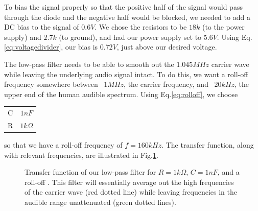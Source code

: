 \documentclass[12pt]{article}
\begin{document}
To bias the signal properly so that the positive half of the signal would pass through the diode and the negative half would be blocked, we needed to add a DC bias to the signal of $0.6V$. We chose the resistors to be $18k$ (to the power supply) and $2.7k$ (to ground), and had our power supply set to $5.6V$. Using Eq.\ref{eq:voltagedivider}, our bias is $0.72V$, just above our desired voltage.

The low-pass filter needs to be able to smooth out the $1.045MHz$ carrier wave while leaving the underlying audio signal intact. To do this, we want a roll-off frequency somewhere between ~$1MHz$, the carrier frequency, and ~$20kHz$, the upper end of the human audible spectrum. Using Eq.\ref{eq:rolloff}, we choose

\begin{center}
  \begin{tabular}{ c  c }
    C & $1nF$ \\
    R & $1k\Omega$ 
  \end{tabular}
\end{center}
so that we have a roll-off frequency of $f=160kHz$. The transfer function, along with relevant frequencies, are illustrated in Fig.\ref{fig:lowpasstransfer}.
 
\begin{figure}[H]
\caption{Transfer function of our low-pass filter for $R =1k\Omega$, $C=1nF$, and a roll-off . This filter will essentially average out the high frequencies of the carrier wave (red dotted line) while leaving frequencies in the audible range unattenuated (green dotted lines).}
\label{fig:lowpasstransfer}
\end{figure}
\end{document}
